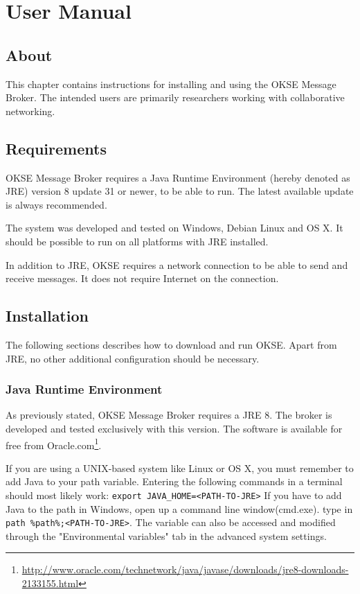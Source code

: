 \chapter{User Manual}

\section{About}

This chapter contains instructions for installing and using the OKSE Message Broker. The intended users are primarily researchers working with collaborative networking.

\section{Requirements}

OKSE Message Broker requires a Java Runtime Environment (hereby denoted as JRE) version 8 update 31 or newer, to be able to run. The latest available update is always recommended. 

The system was developed and tested on Windows, Debian Linux and OS X. It should be possible to run on all platforms with JRE installed. 

In addition to JRE, OKSE requires a network connection to be able to send and receive messages. It does not require Internet on the connection. 

\section{Installation}

The following sections describes how to download and run OKSE. Apart from JRE, no other additional configuration should be necessary.

\subsection{Java Runtime Environment}

As previously stated, OKSE Message Broker requires a JRE 8. The broker is developed and tested exclusively with this version. The software is available for free from Oracle.com\footnote{\url{http://www.oracle.com/technetwork/java/javase/downloads/jre8-downloads-2133155.html}}.

If you are using a UNIX-based system like Linux or OS X, you must remember to add Java to your path variable. Entering the following commands in a terminal should most likely work: \verb!export JAVA_HOME=<PATH-TO-JRE>! If you have to add Java to the path in Windows, open up a command line window(cmd.exe). type in  \verb!path %path%;<PATH-TO-JRE>!.
The variable can also be accessed and modified through the "Environmental variables" tab in the advanced system settings.

